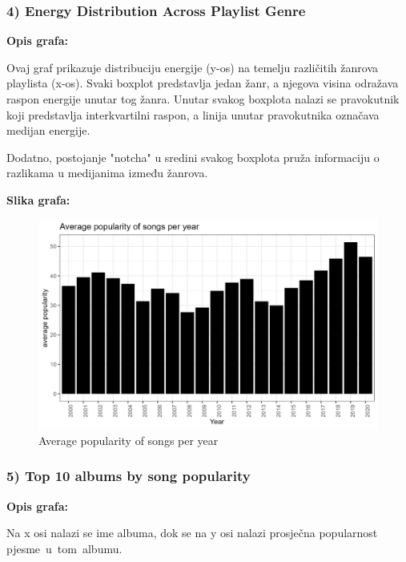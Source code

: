 		\subsubsection{4) Energy Distribution Across Playlist Genre}
	
	\textbf{Opis grafa:}
	
	Ovaj graf prikazuje distribuciju energije (y-os) na temelju različitih žanrova playlista (x-os). Svaki boxplot predstavlja jedan žanr, a njegova visina odražava raspon energije unutar tog žanra. Unutar svakog boxplota nalazi se pravokutnik koji predstavlja interkvartilni raspon, a linija unutar pravokutnika označava medijan energije.
	
	Dodatno, postojanje "notcha" u sredini svakog boxplota pruža informaciju o razlikama u medijanima između žanrova.
	
		\textbf{Slika grafa:}
	\begin{figure}[H]
		\includegraphics[scale=0.9]{slike/Average popularity of songs per year.png}
		\centering
		\caption{Average popularity of songs per year}
		
	\end{figure}
	
	\subsubsection{5) Top 10 albums by song popularity}
	
	\textbf{Opis grafa:}
	
	Na x osi nalazi se ime albuma, dok se na y osi nalazi prosječna popularnost pjesme u tom albumu. 
	

